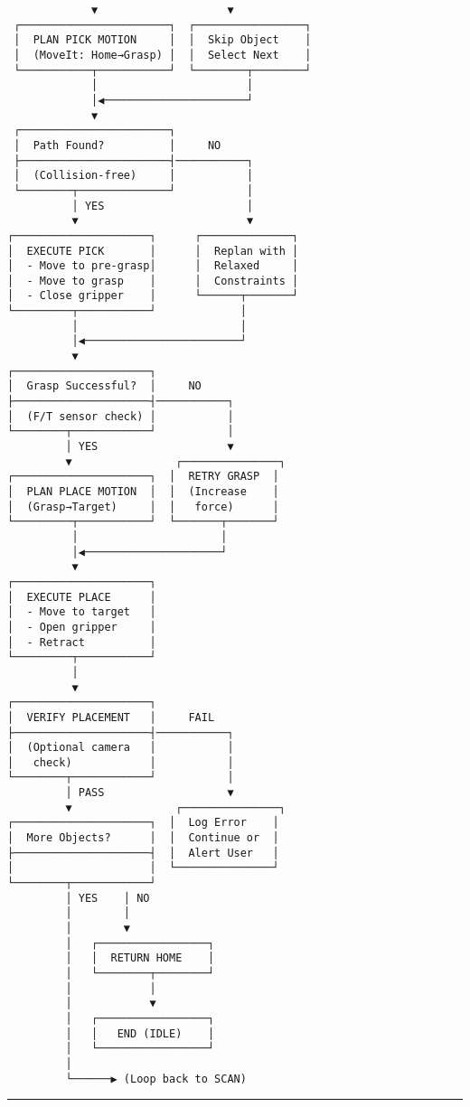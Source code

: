 \documentclass[
]{article}
\begin{document}
\begin{verbatim}
             ▼                    ▼
 ┌───────────────────────┐  ┌─────────────────┐
 │  PLAN PICK MOTION     │  │  Skip Object    │
 │  (MoveIt: Home→Grasp) │  │  Select Next    │
 └───────────┬───────────┘  └────────┬────────┘
             │                       │
             │◀──────────────────────┘
             ▼
 ┌───────────────────────┐
 │  Path Found?          │     NO
 ├───────────────────────┤───────────┐
 │  (Collision-free)     │           │
 └────────┬──────────────┘           │
          │ YES                      │
          ▼                          ▼
┌─────────────────────┐      ┌──────────────┐
│  EXECUTE PICK       │      │  Replan with │
│  - Move to pre-grasp│      │  Relaxed     │
│  - Move to grasp    │      │  Constraints │
│  - Close gripper    │      └──────┬───────┘
└─────────┬───────────┘             │
          │                         │
          │◀────────────────────────┘
          ▼
┌─────────────────────┐
│  Grasp Successful?  │     NO
├─────────────────────┤───────────┐
│  (F/T sensor check) │           │
└────────┬────────────┘           │
         │ YES                    ▼
         ▼                ┌───────────────┐
┌─────────────────────┐  │  RETRY GRASP  │
│  PLAN PLACE MOTION  │  │  (Increase    │
│  (Grasp→Target)     │  │   force)      │
└─────────┬───────────┘  └───────┬───────┘
          │                      │
          │◀─────────────────────┘
          ▼
┌─────────────────────┐
│  EXECUTE PLACE      │
│  - Move to target   │
│  - Open gripper     │
│  - Retract          │
└─────────┬───────────┘
          │
          ▼
┌─────────────────────┐
│  VERIFY PLACEMENT   │     FAIL
├─────────────────────┤───────────┐
│  (Optional camera   │           │
│   check)            │           │
└────────┬────────────┘           │
         │ PASS                   ▼
         ▼                ┌───────────────┐
┌─────────────────────┐  │  Log Error    │
│  More Objects?      │  │  Continue or  │
├─────────────────────┤  │  Alert User   │
│                     │  └───────────────┘
└────────┬────────────┘
         │ YES    │ NO
         │        │
         │        ▼
         │   ┌─────────────────┐
         │   │  RETURN HOME    │
         │   └────────┬────────┘
         │            │
         │            ▼
         │   ┌─────────────────┐
         │   │   END (IDLE)    │
         │   └─────────────────┘
         │
         └──────▶ (Loop back to SCAN)
\end{verbatim}

\begin{center}\rule{0.5\linewidth}{0.5pt}\end{center}
\end{document}
